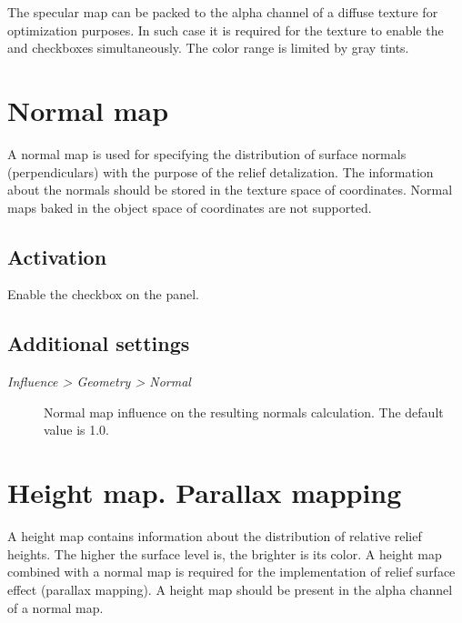 \documentclass[a4paper,12pt,oneside]{sphinxmanual}
\begin{document}
The specular map can be packed to the alpha channel of a diffuse texture for optimization purposes. In such case it is required for the texture to enable the  and  checkboxes simultaneously. The color range is limited by gray tints.


\section{Normal map}
\label{textures:index-6}\label{textures:normal-map}
A normal map is used for specifying the distribution of surface normals (perpendiculars) with the purpose of the relief detalization. The information about the normals should be stored in the texture space of coordinates. Normal maps baked in the object space of coordinates are not supported.


\subsection{Activation}
\label{textures:id8}
Enable the  checkbox on the  panel.


\subsection{Additional settings}
\label{textures:id9}\begin{description}
\item[{\emph{Influence \textgreater{} Geometry \textgreater{} Normal}}] \leavevmode
Normal map influence on the resulting normals calculation. The default value is 1.0.

\end{description}


\section{Height map. Parallax mapping}
\label{textures:index-7}\label{textures:height-map-parallax-mapping}
A height map contains information about the distribution of relative relief heights. The higher the surface level is, the brighter is its color. A height map combined with a normal map is required for the implementation of relief surface effect (parallax mapping). A height map should be present in the alpha channel of a normal map.
\end{document}
